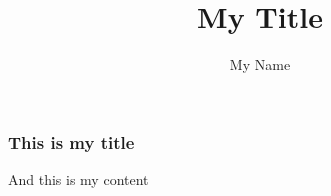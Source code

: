 \documentclass{beamer}
\title[Optional Short Title for Footer]{My Title}
\author{My Name}
\institute{My Workplace}
\begin{document}
\begin{frame}
\titlepage
\end{frame}

\begin{frame}
\frametitle{This is my title}
And this is my content
\end{frame}
\end{document}
